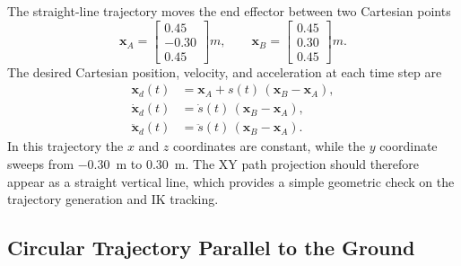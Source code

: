 \documentclass[12pt,a4paper]{article}
\begin{document}
The straight-line trajectory moves the end effector between two Cartesian points
\begin{equation}
    \bm{x}_A =
    \begin{bmatrix} 0.45 \\ -0.30 \\ 0.45 \end{bmatrix}\si{m},
    \qquad
    \bm{x}_B =
    \begin{bmatrix} 0.45 \\ 0.30 \\ 0.45 \end{bmatrix}\si{m}.
\end{equation}
The desired Cartesian position, velocity, and acceleration at each time step are
\begin{align}
    \bm{x}_d(t)      &= \bm{x}_A + s(t)\,(\bm{x}_B - \bm{x}_A), \\
    \dot{\bm{x}}_d(t)  &= \dot{s}(t)\,(\bm{x}_B - \bm{x}_A), \\
    \ddot{\bm{x}}_d(t) &= \ddot{s}(t)\,(\bm{x}_B - \bm{x}_A).
\end{align}
In this trajectory the $x$ and $z$ coordinates are constant, while the $y$ coordinate sweeps
from \SI{-0.30}{m} to \SI{+0.30}{m}. The XY path projection should therefore appear as a
straight vertical line, which provides a simple geometric check on the trajectory generation
and IK tracking.

\subsection{Circular Trajectory Parallel to the Ground}
\end{document}
